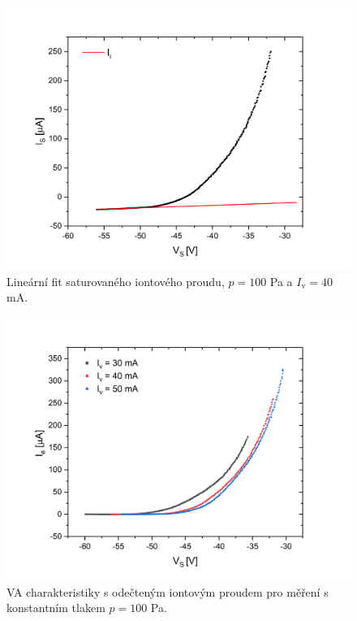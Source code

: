 \documentclass[a4paper,12pt]{article}
\begin{document}
\begin{figure}[h]
	\centering
	\includegraphics[width=145mm]{iiont.png}
	\caption{Lineární fit saturovaného iontového proudu, $p = 100$ \si{\pascal} a $I_\text{v} = 40$ \si{\milli\ampere}.}
	\label{iiont}
\end{figure}

\newpage
\begin{figure}[h!]
	\centering
	\includegraphics[width=135mm]{odectene012.png}
	\caption{VA charakteristiky s odečteným iontovým proudem pro měření s konstantním tlakem $p = 100$ \si{\pascal}.}
	\label{odectene012}
\end{figure}
\end{document}
